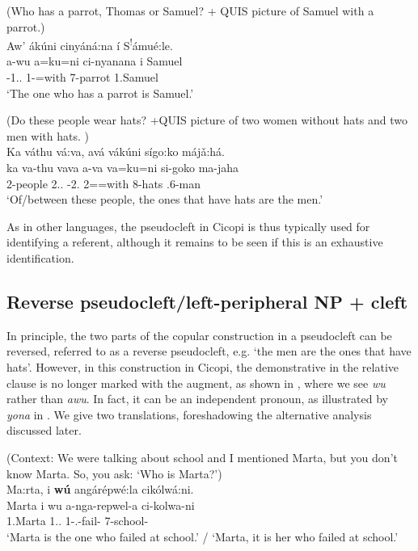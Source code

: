 \documentclass[output=paper]{langscibook}
\begin{document}
\z

\ea
\label{bkm:Ref120696809}
(Who has a parrot, Thomas or Samuel? + QUIS picture of Samuel with a parrot.)\\
Aw’ ákúni cinyáná:na í S\textsuperscript{!}ámué:le.\\
\gll
a-wu  a=ku=ni  ci-nyanana  i  Samuel\\
\AUG{}-1.\DEM{}.\PROX{}  1\SM{}-\REL{}=with  7-parrot  \COP{}  1.Samuel\\
\glt
‘The one who has a parrot is Samuel.’\\

\z

\ea
\label{bkm:Ref120696812}
(Do these people wear hats? +QUIS picture of two women without hats and two men with hats. )\\
Ka váthu vá:va, avá vákúni sígo:ko májǎ:há.\\
\gll
ka  va-thu  vava  a-va  va=ku=ni  si-goko  ma-jaha\\
\LOC{}  2-people  2.\DEM{}.\PROX{}  \AUG{}-2.\PRO{}  2\SM=\REL{}=with  8-hats  \COP{}.6-man\\
\glt
‘Of/between these people, the ones that have hats are the men.’\\

\z

As in other languages, the pseudocleft in Cicopi is thus typically used for identifying a referent, although it remains to be seen if this is an exhaustive identification.

\subsection{Reverse pseudocleft\slash left-peripheral NP + cleft}

In principle, the two parts of the copular construction in a pseudocleft can be reversed, referred to as a reverse pseudocleft, e.g. ‘the men are the ones that have hats’. However, in this construction in Cicopi, the demonstrative in the relative clause is no longer marked with the augment, as shown in , where we see \textit{wu} rather than \textit{awu}. In fact, it can be an independent pronoun, as illustrated by \textit{yona} in . We give two translations, foreshadowing the alternative analysis discussed later.

\ea
\label{bkm:Ref127264015}
(Context: We were talking about school and I mentioned Marta, but you don’t know Marta. So, you ask: ‘Who is Marta?’)\\
Ma:rta, i \textbf{wú} angárépwé:la cikólwá:ni.\\
\gll
Marta  i  wu  a-nga-repwel-a  ci-kolwa-ni\\
1.Marta  \COP{}  1.\DEM{}.\PROX{}  1\SM{}-\REL{}.\PST{}-fail-\FV{}  7-school-\LOC{}\\
\glt
‘Marta is the one who failed at school.’ / ‘Marta, it is her who failed at school.’\\
\end{document}
